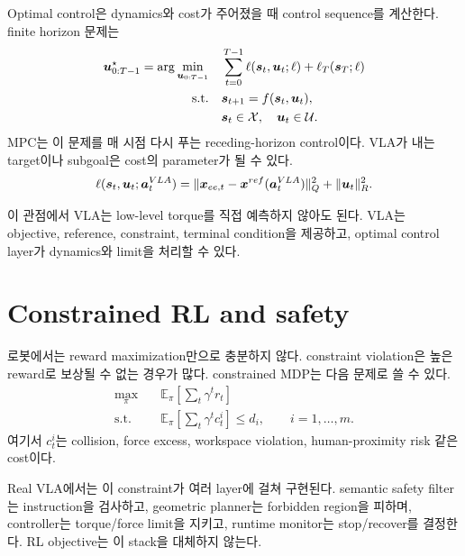 Optimal control은 dynamics와 cost가 주어졌을 때 control sequence를 계산한다. finite horizon 문제는
\begin{equation}
\begin{aligned}
  \bm{u}_{0:T-1}^{\star}
  =
  \arg\min_{\bm{u}_{0:T-1}}
  &\quad
  \sum_{t=0}^{T-1}
  \ell(\bm{s}_t,\bm{u}_t;\ell)
  +
  \ell_T(\bm{s}_T;\ell)\\
  \text{s.t.}
  &\quad
  \bm{s}_{t+1}=f(\bm{s}_t,\bm{u}_t),\\
  &\quad
  \bm{s}_t\in\mathcal{X},\quad
  \bm{u}_t\in\mathcal{U}.
\end{aligned}
\label{eq:finite-horizon-oc}
\end{equation}
MPC는 이 문제를 매 시점 다시 푸는 receding-horizon control이다. VLA가 내는 target이나 subgoal은 cost의 parameter가 될 수 있다.
\begin{equation}
  \ell(\bm{s}_t,\bm{u}_t;\bm{a}^{VLA}_t)
  =
  \|\bm{x}_{ee,t}-\bm{x}^{ref}(\bm{a}^{VLA}_t)\|_{Q}^{2}
  +
  \|\bm{u}_t\|_{R}^{2}.
  \label{eq:vla-mpc-cost}
\end{equation}

이 관점에서 VLA는 low-level torque를 직접 예측하지 않아도 된다. VLA는 objective, reference, constraint, terminal condition을 제공하고, optimal control layer가 dynamics와 limit을 처리할 수 있다.

\section{Constrained RL and safety}

로봇에서는 reward maximization만으로 충분하지 않다. constraint violation은 높은 reward로 보상될 수 없는 경우가 많다. constrained MDP는 다음 문제로 쓸 수 있다.
\begin{equation}
\begin{aligned}
  \max_{\pi}
  &\quad
  \mathbb{E}_{\pi}\left[\sum_t \gamma^t r_t\right]\\
  \text{s.t.}
  &\quad
  \mathbb{E}_{\pi}\left[\sum_t \gamma^t c^i_t\right]\le d_i,
  \qquad i=1,\ldots,m.
\end{aligned}
\label{eq:constrained-rl}
\end{equation}
여기서 $c^i_t$는 collision, force excess, workspace violation, human-proximity risk 같은 cost이다.

Real VLA에서는 이 constraint가 여러 layer에 걸쳐 구현된다. semantic safety filter는 instruction을 검사하고, geometric planner는 forbidden region을 피하며, controller는 torque/force limit을 지키고, runtime monitor는 stop/recover를 결정한다. RL objective는 이 stack을 대체하지 않는다.

